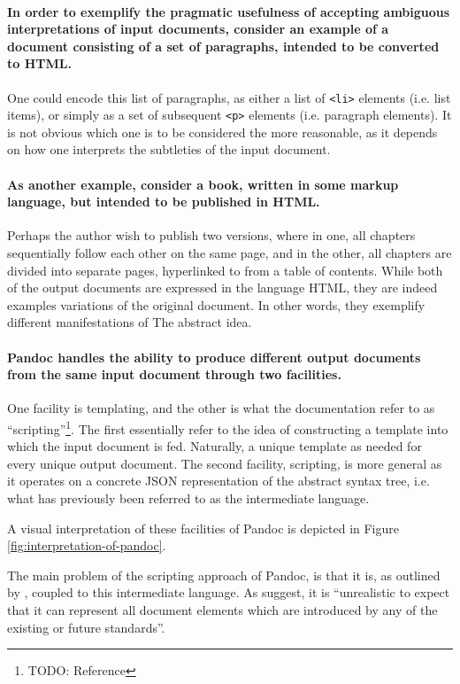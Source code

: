 \documentclass{scrreprt}
\begin{document}
\paragraph{In order to exemplify the pragmatic usefulness of accepting ambiguous interpretations of input documents, consider an example of a document consisting of a set of paragraphs, intended to be converted to HTML.} One could encode this list of paragraphs, as either a list of \texttt{<li>} elements (i.e. list items), or simply as a set of subsequent \texttt{<p>} elements (i.e. paragraph elements). It is not obvious which one is to be considered the more reasonable, as it depends on how one interprets the subtleties of the input document.

\paragraph{As another example, consider a book, written in some markup language, but intended to be published in HTML.} Perhaps the author wish to publish two versions, where in one, all chapters sequentially follow each other on the same page, and in the other, all chapters are divided into separate pages, hyperlinked to from a table of contents. While both of the output documents are expressed in the language HTML, they are indeed examples variations of the original document. In other words, they exemplify different manifestations of The abstract idea.




\paragraph{Pandoc handles the ability to produce different output documents from the same input document through two facilities.} One facility is templating, and the other is what the documentation refer to as ``scripting''\footnote{TODO: Reference}. The first essentially refer to the idea of constructing a template into which the input document is fed. Naturally, a unique template as needed for every unique output document. The second facility, scripting, is more general as it operates on a concrete JSON representation of the abstract syntax tree, i.e. what has previously been referred to as the intermediate language.

A visual interpretation of these facilities of Pandoc is depicted in Figure \ref{fig:interpretation-of-pandoc}.

The main problem of the scripting approach of Pandoc, is that it is, as outlined by \citet{krijnen}, coupled to this intermediate language. As \citet{krijnen} suggest, it is ``unrealistic to expect that it can represent all document elements which are introduced by any of the existing or future standards''.
\end{document}
